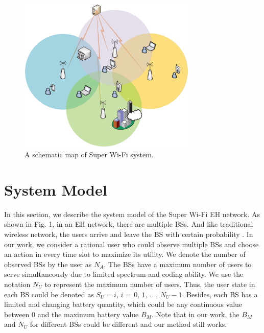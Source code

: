 \documentclass[conference]{IEEEtran}
\begin{document}
\begin{figure}\label{fig1}
\centering
\includegraphics[width=8.5cm]{Fig1.eps}
\caption{A schematic map of Super Wi-Fi system.}
\end{figure}
\section{System Model}
In this section, we describe the system model of the Super Wi-Fi EH network.
As shown in Fig. 1, in an EH network, there are multiple BSs. 
And like traditional wireless network, the users arrive and leave the BS with certain probability \cite{5}.
In our work, we consider a rational user who could observe multiple BSs and
choose an action in every time slot to maximize its utility.
We denote the number of observed BSs by the user as \(N_A\).
The BSs have a maximum number of users to serve simultaneously due to limited spectrum and coding ability.
We use the notation \(N_U\) to represent the maximum number of users.
Thus, the user state in each BS could be denoted as \(S_U = i,\, i = \,0,\,1,\,\ldots,\,N_U-1\).
Besides, each BS has a limited and changing battery quantity,
which could be any continuous value between \(0\) and the maximum battery value \(B_M\).
Note that in our work, the \(B_M\) and \(N_U\) for different BSs could be different and our method still works.\\
\end{document}
